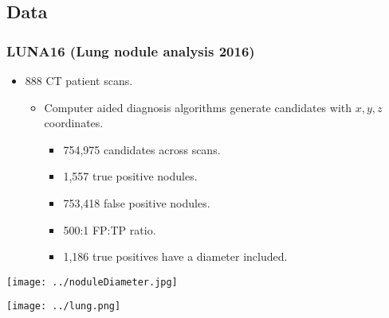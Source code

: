 \documentclass[11pt]{beamer}
\begin{document}
\subsection{Data}
\begin{frame}
\frametitle{LUNA16 (Lung nodule analysis 2016)}
\begin{itemize}
\item 888 CT patient scans.

\begin{itemize}
\item Computer aided diagnosis algorithms generate candidates with $x,y,z$ coordinates.
\begin{itemize}
\item 754,975 candidates across scans.
\item 1,557 true positive nodules.
\item 753,418 false positive nodules.
\item 500:1 FP:TP ratio.
\item 1,186 true positives have a diameter included.
\end{itemize}
\end{itemize}
\end{itemize}
\begin{center}
\texttt{[image: ../noduleDiameter.jpg]}
\end{center}

\end{frame}
\begin{frame}
\begin{center}
\texttt{[image: ../lung.png]}
\end{center}


\end{frame}
\end{document}
